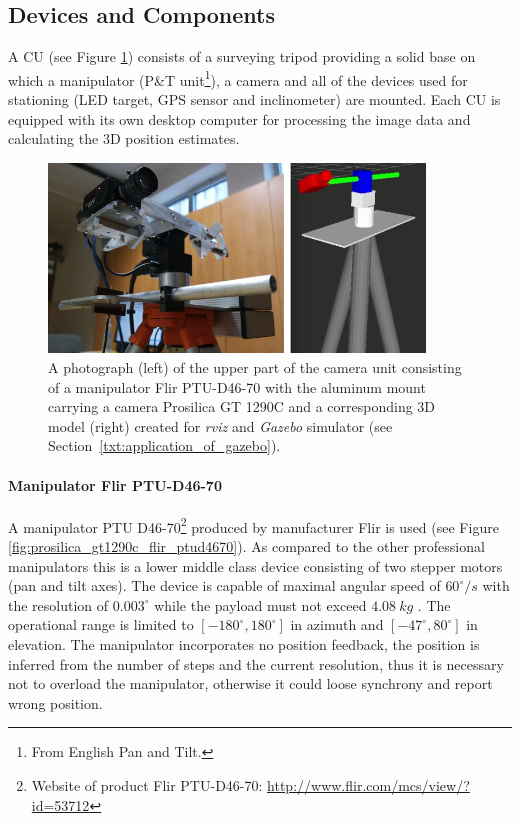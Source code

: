 \subsection{Devices and Components} \label{txt:devices}

A CU (see Figure \ref{fig:camera_unit_photo_model}) consists of a surveying tripod providing a solid base on which a manipulator (P\&T unit\footnote{From English Pan and Tilt.}), a camera and all of the devices used for stationing (LED target, GPS sensor and inclinometer) are mounted. Each CU is equipped with its own desktop computer for processing the image data and calculating the 3D position estimates.

\begin{figure}[tbh]
	\centering
	\includegraphics[width=10cm]{fig/camera_unit_photo_model.jpg}
	\caption{A photograph (left) of the upper part of the camera unit consisting of a manipulator Flir PTU-D46-70 with the aluminum mount carrying a camera Prosilica GT 1290C and a corresponding 3D model (right) created for \textit{rviz} and \textit{Gazebo} simulator (see Section~\ref{txt:application_of_gazebo}).}
	\label{fig:camera_unit_photo_model}
\end{figure}

\paragraph{Manipulator Flir PTU-D46-70} A manipulator PTU D46-70\footnote{Website of product Flir PTU-D46-70: \url{http://www.flir.com/mcs/view/?id=53712}} produced by manufacturer Flir is used (see Figure \ref{fig:prosilica_gt1290c_flir_ptud4670}). As compared to the other professional manipulators this is a lower middle class device consisting of two stepper motors (pan and tilt axes). The device is capable of maximal angular speed of $60^{\circ}/s$ with the resolution of $0.003^{\circ}$ while the payload must not exceed $4.08~kg$ \cite{Flir_ptud4670}. The operational range is limited to $[-180^{\circ}, 180^{\circ}]$ in azimuth and $[-47^{\circ}, 80^{\circ}]$ in elevation. The manipulator incorporates no position feedback, the position is inferred from the number of steps and the current resolution, thus it is necessary not to overload the manipulator, otherwise it could loose synchrony and report wrong position.

